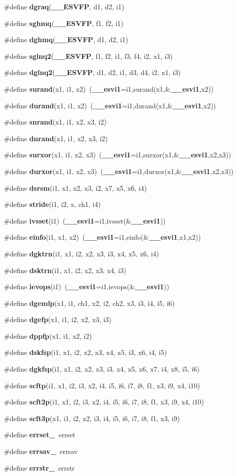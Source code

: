 \begin{CompactItemize}
\item 
\#define {\bf dgraq}({\bf \_\-\_\-ESVFP}, d1, d2, i1)
\item 
\#define {\bf sghmq}({\bf \_\-\_\-ESVFP}, f1, f2, i1)
\item 
\#define {\bf dghmq}({\bf \_\-\_\-ESVFP}, d1, d2, i1)
\item 
\#define {\bf sglnq2}({\bf \_\-\_\-ESVFP}, f1, f2, i1, f3, f4, i2, x1, i3)
\item 
\#define {\bf dglnq2}({\bf \_\-\_\-ESVFP}, d1, d2, i1, d3, d4, i2, x1, i3)
\item 
\#define {\bf surand}(x1, i1, x2)~({\bf \_\-\_\-esvi1}=i1,surand(x1,\&{\bf \_\-\_\-esvi1},x2))
\item 
\#define {\bf durand}(x1, i1, x2)~({\bf \_\-\_\-esvi1}=i1,durand(x1,\&{\bf \_\-\_\-esvi1},x2))
\item 
\#define {\bf snrand}(x1, i1, x2, x3, i2)
\item 
\#define {\bf dnrand}(x1, i1, x2, x3, i2)
\item 
\#define {\bf surxor}(x1, i1, x2, x3)~({\bf \_\-\_\-esvi1}=i1,surxor(x1,\&{\bf \_\-\_\-esvi1},x2,x3))
\item 
\#define {\bf durxor}(x1, i1, x2, x3)~({\bf \_\-\_\-esvi1}=i1,durxor(x1,\&{\bf \_\-\_\-esvi1},x2,x3))
\item 
\#define {\bf dsrsm}(i1, x1, x2, x3, i2, x7, x5, x6, i4)
\item 
\#define {\bf stride}(i1, i2, x, ch1, i4)
\item 
\#define {\bf ivsset}(i1)~({\bf \_\-\_\-esvi1}=i1,ivsset(\&{\bf \_\-\_\-esvi1}))
\item 
\#define {\bf einfo}(i1, x1, x2)~({\bf \_\-\_\-esvi1}=i1,einfo(\&{\bf \_\-\_\-esvi1},x1,x2))
\item 
\#define {\bf dgktrn}(i1, x1, i2, x2, x3, i3, x4, x5, x6, i4)
\item 
\#define {\bf dsktrn}(i1, x1, i2, x2, x3, x4, i3)
\item 
\#define {\bf ievops}(i1)~({\bf \_\-\_\-esvi1}=i1,ievops(\&{\bf \_\-\_\-esvi1}))
\item 
\#define {\bf dgemlp}(x1, i1, ch1, x2, i2, ch2, x3, i3, i4, i5, i6)
\item 
\#define {\bf dgefp}(x1, i1, i2, x2, x3, i3)
\item 
\#define {\bf dppfp}(x1, i1, x2, i2)
\item 
\#define {\bf dskfsp}(i1, x1, i2, x2, x3, x4, x5, i3, x6, i4, i5)
\item 
\#define {\bf dgkfsp}(i1, x1, i2, x2, x3, i3, x4, x5, x6, x7, i4, x8, i5, i6)
\item 
\#define {\bf scftp}(i1, x1, i2, i3, x2, i4, i5, i6, i7, i8, f1, x3, i9, x4, i10)
\item 
\#define {\bf scft2p}(i1, x1, i2, i3, x2, i4, i5, i6, i7, i8, f1, x3, i9, x4, i10)
\item 
\#define {\bf scft3p}(x1, i1, i2, x2, i3, i4, i5, i6, i7, i8, f1, x3, i9)
\item 
\#define {\bf errset\_\-}~errset
\item 
\#define {\bf errsav\_\-}~errsav
\item 
\#define {\bf errstr\_\-}~errstr
\end{CompactItemize}
